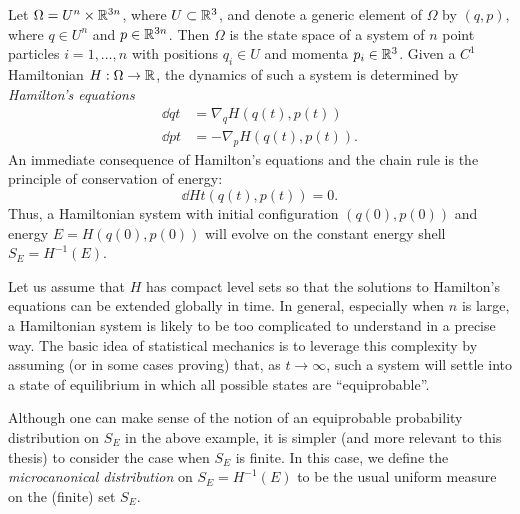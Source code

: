 \begin{example}
Let $\Omega = U^n \times {\mathbb R}^{3n}$, where $U \subset {\mathbb R}^3$, and denote a generic element of
$\Omega$ by $(q, p)$, where $q \in U^n$ and $p \in {\mathbb R}^{3n}$. Then $\Omega$ is the state
space of a system of $n$ point particles $i = 1, \ldots, n$ with positions $q_i \in U$
and momenta $p_i \in {\mathbb R}^3$. Given a $C^1$ Hamiltonian $H : \Omega \rightarrow {\mathbb R}$,
the dynamics of such a system is determined by \emph{Hamilton's equations}
\begin{align}
\dd{q}{t} &= \nabla_q H(q(t), p(t)) \\
\dd{p}{t} &= -\nabla_p H(q(t), p(t)).
\end{align}
An immediate consequence of Hamilton's equations and the chain rule is the principle
of conservation of energy:
\begin{equation}
\dd{H}{t}(q(t), p(t)) = 0.
\end{equation}
Thus, a Hamiltonian system with initial configuration $(q(0), p(0))$ and energy
$E = H(q(0), p(0))$ will evolve on the constant energy shell $S_E = H^{-1}(E)$.

Let us assume that $H$ has compact level sets so that the solutions to Hamilton's
equations can be extended globally in time. In general, especially when $n$ is large,
a Hamiltonian system is likely to be too complicated to understand in a precise way.
The basic idea of statistical mechanics is to leverage this complexity by assuming
(or in some cases proving) that, as $t\to\infty$, such a system will settle into a
state of equilibrium in which all possible states are ``equiprobable''.
\end{example}

Although one can make sense of the notion of an equiprobable probability distribution
on $S_E$ in the above example, it is simpler (and more relevant to this thesis) to
consider the case when $S_E$ is finite. In this case, we define the
\emph{microcanonical distribution} on $S_E = H^{-1}(E)$ to be the usual uniform
measure on the (finite) set $S_E$.

